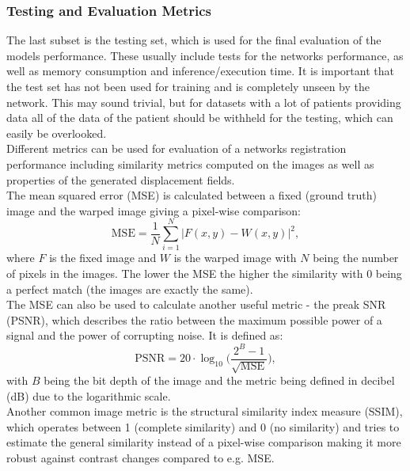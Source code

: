 \subsubsection{Testing and Evaluation Metrics} \label{SubSubSec:TestingEvalutionMetrics}
The last subset is the testing set, which is used for the final evaluation of the models performance. These usually include tests for the networks performance, as well as memory consumption and inference/execution time. It is important that the test set has not been used for training and is completely unseen by the network. This may sound trivial, but for datasets with a lot of patients providing data all of the data of the patient should be withheld for the testing, which can easily be overlooked.\\
Different metrics can be used for evaluation of a networks registration performance including similarity metrics computed on the images as well as properties of the generated displacement fields. \\
The mean squared error (MSE) is calculated between a fixed (ground truth) image and the warped image giving a pixel-wise comparison:
\begin{equation}
	\text{MSE} = \frac{1}{N} \sum_{i=1}^{N} |F(x,y) - W(x,y)|^2,
\end{equation}
where $F$ is the fixed image and $W$ is the warped image with $N$ being the number of pixels in the images. The lower the MSE the higher the similarity with 0 being a perfect match (the images are exactly the same).\\
The MSE can also be used to calculate another useful metric - the preak SNR (PSNR), which describes the ratio between the maximum possible power of a signal and the power of corrupting noise. It is defined as:
\begin{equation}
	\text{PSNR} = 20 \cdot \log_{10} \bigg(\frac{2^B - 1}{\sqrt{\text{MSE}}} \bigg),
\end{equation}
with $B$ being the bit depth of the image and the metric being defined in decibel (dB) due to the logarithmic scale.\\
Another common image metric is the structural similarity index measure (SSIM), which operates between 1 (complete similarity) and 0 (no similarity) and tries to estimate the general similarity instead of a pixel-wise comparison making it more robust against contrast changes compared to e.g. MSE.
